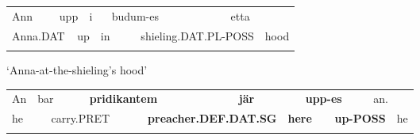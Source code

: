\begin{listWWNumlxxviileveli}
\item 

\end{listWWNumlxxviileveli}

\begin{tabular}{llllllllll}
\lsptoprule
\footnotemark{}Ann & \multicolumn{2}{l}{upp

} & \multicolumn{2}{l}{i

} & \multicolumn{2}{l}{budum-es 

} & \multicolumn{2}{l}{etta 

} & \\
\multicolumn{2}{l}{Anna.DAT

} & \multicolumn{2}{l}{up

} & \multicolumn{2}{l}{in

} & \multicolumn{2}{l}{shieling.DAT.PL-POSS

} & \multicolumn{2}{l}{hood

}\\
\lspbottomrule
\end{tabular}

\footnotetext{}

\begin{styleTranslation}
‘Anna-at-the-shieling’s hood’ 

\end{styleTranslation}

\begin{tabular}{llllllllllll}
\lsptoprule
An & \multicolumn{2}{l}{bar

} & \multicolumn{2}{l}{{\bfseries pridikantem}

} & \multicolumn{2}{l}{{\bfseries jär}

} & \multicolumn{2}{l}{{\bfseries upp-es}

} & \multicolumn{2}{l}{an. 

} & \\
\multicolumn{2}{l}{he

} & \multicolumn{2}{l}{carry.PRET

} & \multicolumn{2}{l}{{\bfseries preacher.DEF.DAT.SG}

} & \multicolumn{2}{l}{{\bfseries here}

} & \multicolumn{2}{l}{{\bfseries up-POSS}

} & \multicolumn{2}{l}{he

}\\
\lspbottomrule
\end{tabular}

